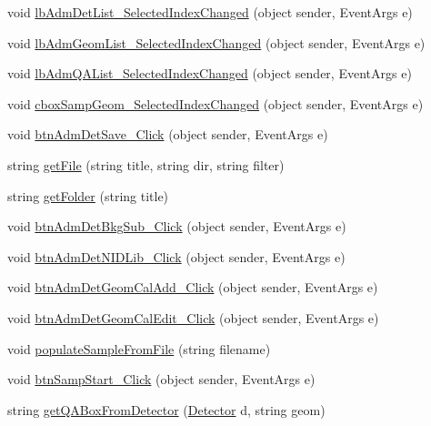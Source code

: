 \begin{DoxyCompactItemize}
void \hyperlink{class_scintilab_1_1_form_main_ab155e944ae752fdde630c1f4a4827902}{lb\+Adm\+Det\+List\+\_\+\+Selected\+Index\+Changed} (object sender, Event\+Args e)
\item 
void \hyperlink{class_scintilab_1_1_form_main_ae3ae1f6cec4d61f964b0c4e0a4468a4c}{lb\+Adm\+Geom\+List\+\_\+\+Selected\+Index\+Changed} (object sender, Event\+Args e)
\item 
void \hyperlink{class_scintilab_1_1_form_main_adb8fdd0575ceff94bb6a842e25b9f0f1}{lb\+Adm\+Q\+A\+List\+\_\+\+Selected\+Index\+Changed} (object sender, Event\+Args e)
\item 
void \hyperlink{class_scintilab_1_1_form_main_a262b28336ad08680d43100f4cd5afe03}{cbox\+Samp\+Geom\+\_\+\+Selected\+Index\+Changed} (object sender, Event\+Args e)
\item 
void \hyperlink{class_scintilab_1_1_form_main_a182cf23da0489ee71d0fd1a90abacdf0}{btn\+Adm\+Det\+Save\+\_\+\+Click} (object sender, Event\+Args e)
\item 
string \hyperlink{class_scintilab_1_1_form_main_aaac85ee2e1b1f107ed9f653435c6b025}{get\+File} (string title, string dir, string filter)
\item 
string \hyperlink{class_scintilab_1_1_form_main_af1dbdd5d9d15c9a665a249394091b4f1}{get\+Folder} (string title)
\item 
void \hyperlink{class_scintilab_1_1_form_main_adaf37500d9e85e8a8fa5494e0070994c}{btn\+Adm\+Det\+Bkg\+Sub\+\_\+\+Click} (object sender, Event\+Args e)
\item 
void \hyperlink{class_scintilab_1_1_form_main_a675dfb6e115d582b0158853c9ac698e2}{btn\+Adm\+Det\+N\+I\+D\+Lib\+\_\+\+Click} (object sender, Event\+Args e)
\item 
void \hyperlink{class_scintilab_1_1_form_main_a45d3024dfac28a98d3f282079dd53206}{btn\+Adm\+Det\+Geom\+Cal\+Add\+\_\+\+Click} (object sender, Event\+Args e)
\item 
void \hyperlink{class_scintilab_1_1_form_main_ad3fe00a88fb8da2b88832fc60e7fd674}{btn\+Adm\+Det\+Geom\+Cal\+Edit\+\_\+\+Click} (object sender, Event\+Args e)
\item 
void \hyperlink{class_scintilab_1_1_form_main_a93fd0bccb6ec721eca356f868939e68b}{populate\+Sample\+From\+File} (string filename)
\item 
void \hyperlink{class_scintilab_1_1_form_main_a12209de63c7a7c7d6790466e9be3edd5}{btn\+Samp\+Start\+\_\+\+Click} (object sender, Event\+Args e)
\item 
string \hyperlink{class_scintilab_1_1_form_main_ad8de93638ebc50f712d85af269ba383d}{get\+Q\+A\+Box\+From\+Detector} (\hyperlink{class_scintilab_1_1_detector}{Detector} d, string geom)

\end{DoxyCompactItemize}
